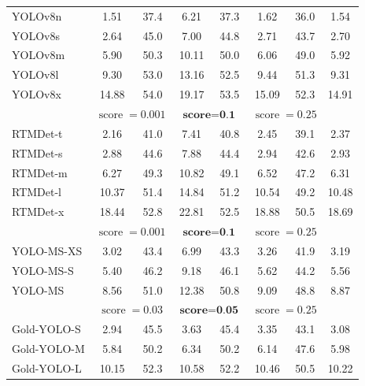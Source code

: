 \documentclass[runningheads]{llncs}
\begin{document}
\begin{table}[t]
\begin{tabular}{lc|cc|cc|cc}
    \hline
    YOLOv8n & 1.51 & 37.4 & 6.21 & 37.3 & 1.62 & 36.0 & 1.54 \\
    YOLOv8s & 2.64 & 45.0 & 7.00 & 44.8 & 2.71 & 43.7 & 2.70 \\
    YOLOv8m & 5.90 & 50.3 & 10.11 & 50.0 & 6.06 & 49.0 & 5.92 \\
    YOLOv8l & 9.30 & 53.0 & 13.16 & 52.5 & 9.44 & 51.3 & 9.31 \\
    YOLOv8x & 14.88 & 54.0 & 19.17 & 53.5 & 15.09 & 52.3 & 14.91 \\
    \shline
    \multicolumn{2}{c|}{Thresholds}  & \multicolumn{2}{c|}{\textit{$\operatorname{score}=0.001$}} & \multicolumn{2}{c|}{$\operatorname{\textbf{score}}\textbf{=}\textbf{0.1}$} & \multicolumn{2}{c}{$\operatorname{score}=0.25$} \\
    \hline
    RTMDet-t & 2.16 & 41.0 & 7.41 & 40.8 & 2.45 & 39.1 & 2.37 \\
    RTMDet-s & 2.88 & 44.6 & 7.88 & 44.4 & 2.94 & 42.6 & 2.93 \\
    RTMDet-m & 6.27 & 49.3 & 10.82 & 49.1 & 6.52 & 47.2 & 6.31 \\
    RTMDet-l & 10.37 & 51.4 & 14.84 & 51.2 & 10.54 & 49.2 & 10.48 \\
    RTMDet-x & 18.44 & 52.8 & 22.81 & 52.5 & 18.88 & 50.5 & 18.69 \\
    \shline
    \multicolumn{2}{c|}{Thresholds}  & \multicolumn{2}{c|}{\textit{$\operatorname{score}=0.001$}} & \multicolumn{2}{c|}{$\operatorname{\textbf{score}}\textbf{=}\textbf{0.1}$} & \multicolumn{2}{c}{$\operatorname{score}=0.25$} \\
    \hline
    YOLO-MS-XS & 3.02 & 43.4 & 6.99 & 43.3 & 3.26 & 41.9 & 3.19 \\
    YOLO-MS-S & 5.40 & 46.2 & 9.18 & 46.1 & 5.62 & 44.2 & 5.56 \\
    YOLO-MS & 8.56 & 51.0 & 12.38 & 50.8 & 9.09 & 48.8 & 8.87  \\
    \shline
    \multicolumn{2}{c|}{Thresholds}  & \multicolumn{2}{c|}{\textit{$\operatorname{score}=0.03$}} & \multicolumn{2}{c|}{$\operatorname{\textbf{score}}\textbf{=}\textbf{0.05}$} & \multicolumn{2}{c}{$\operatorname{score}=0.25$} \\
    \hline
    Gold-YOLO-S & 2.94 & 45.5 & 3.63 & 45.4 & 3.35 & 43.1 & 3.08 \\
    Gold-YOLO-M & 5.84 & 50.2 & 6.34 & 50.2 & 6.14 & 47.6 & 5.98 \\
    Gold-YOLO-L & 10.15 & 52.3 & 10.58 & 52.2 & 10.46 & 50.5 & 10.22 \\
  \end{tabular}
  \label{tab:nms_analysis}
  \vspace{-3mm}
\end{table}
\end{document}
